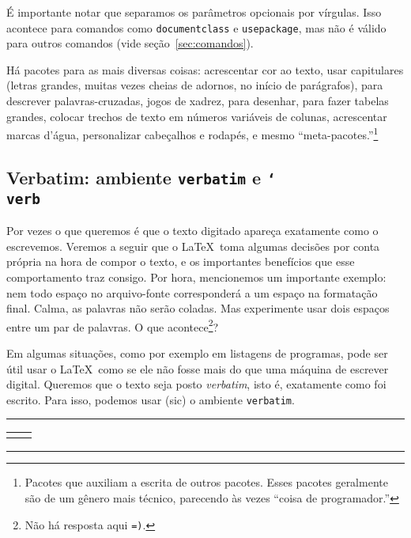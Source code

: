 É importante notar que separamos os parâmetros opcionais por
vírgulas. Isso acontece para comandos como \texttt{documentclass} e
\texttt{usepackage}, mas não é válido para outros comandos (vide
seção~\ref{sec:comandos}).

Há pacotes para as mais diversas coisas: acrescentar cor ao texto,
usar capitulares (letras grandes, muitas vezes cheias de adornos, no
início de parágrafos), para descrever palavras-cruzadas, jogos de
xadrez, para desenhar, para fazer tabelas grandes, colocar trechos de
texto em números variáveis de colunas, acrescentar marcas d'água,
personalizar cabeçalhos e rodapés, e mesmo
``meta-pacotes.''\footnote{Pacotes que auxiliam a escrita de outros
  pacotes. Esses pacotes geralmente são de um gênero mais técnico,
  parecendo às vezes ``coisa de programador.''}

\subsection{%
  \texorpdfstring{%
  Verbatim: ambiente \texttt{verbatim} e \texttt{\char`\\{}verb}}{%
  Verbatim: ambiente verbatim e \textbackslash verb}}

Por vezes o que queremos é que o texto digitado apareça exatamente
como o escrevemos. Veremos a seguir que o \LaTeX\ toma algumas
decisões por conta própria na hora de compor o texto, e os importantes
benefícios que esse comportamento traz consigo. Por hora, mencionemos
um importante exemplo: nem todo espaço no arquivo-fonte corresponderá
a um espaço na formatação final. Calma, as palavras não serão
coladas. Mas experimente usar dois espaços entre um par de palavras. O
que acontece\footnote{Não há resposta aqui \texttt{=)}.}?

Em algumas situações, como por exemplo em listagens de programas, pode
ser útil usar o \LaTeX\ como se ele não fosse mais do que uma máquina
de escrever digital. Queremos que o texto seja posto \emph{verbatim},
isto é, exatamente como foi escrito. Para isso, podemos usar (sic) o
ambiente \verb'verbatim'.

\medskip
\begin{center}\footnotesize\hrule\smallskip
\begin{tabular}{c|c}
\begin{minipage}{.465\textwidth}

\end{minipage} &
\begin{minipage}{.465\textwidth}

\end{minipage}
\end{tabular}
\smallskip\hrule
\end{center}
\medskip

